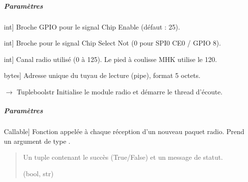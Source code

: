 \documentclass[letterpaper,10pt,french]{sphinxmanual}
\begin{document}
\begin{fulllineitems}
\begin{fulllineitems}
\subparagraph{Paramètres}
\label{\detokenize{api/hardware.transports:id1}}\begin{description}
\sphinxlineitem{ce\_pin}{[}int{]}
\sphinxAtStartPar
Broche GPIO pour le signal Chip Enable (défaut : 25).

\sphinxlineitem{csn\_pin}{[}int{]}
\sphinxAtStartPar
Broche pour le signal Chip Select Not (0 pour SPI0 CE0 / GPIO 8).

\sphinxlineitem{channel}{[}int{]}
\sphinxAtStartPar
Canal radio utilisé (0 à 125). Le pied à coulisse MHK utilise le 120.

\sphinxlineitem{address}{[}bytes{]}
\sphinxAtStartPar
Adresse unique du tuyau de lecture (pipe), format 5 octets.

\end{description}

\end{fulllineitems}


\begin{fulllineitems}
\label{\detokenize{api/hardware.transports:hardware.transports.nrf24_transport.Nrf24Transport.start}}
\pysigstartsignatures
\pysiglinewithargsret
{}
{}
{{ $\rightarrow$ Tuple\DUrole{p}{{[}}boolstr\DUrole{p}{{]}}}}
\pysigstopsignatures
\sphinxAtStartPar
Initialise le module radio et démarre le thread d’écoute.


\subparagraph{Paramètres}
\label{\detokenize{api/hardware.transports:id2}}\begin{description}
\sphinxlineitem{on\_packet\_callback}{[}Callable{]}
\sphinxAtStartPar
Fonction appelée à chaque réception d’un nouveau paquet radio.
Prend un argument de type .

\end{description}
\begin{quote}\begin{description}
\sphinxAtStartPar
Un tuple contenant le succès (True/False) et un message de statut.

\sphinxAtStartPar
(bool, str)


\end{description}
\end{quote}
\end{fulllineitems}
\end{fulllineitems}
\end{document}
